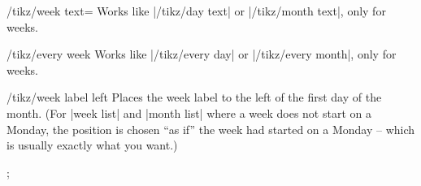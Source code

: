 \begin{multicols}{2}
\begin{key}{/tikz/week text=}
  Works like |/tikz/day text| or |/tikz/month text|, only for weeks.
\end{key}

\begin{stylekey}{/tikz/every week}
  Works like |/tikz/every day| or |/tikz/every month|, only for weeks.
\end{stylekey}

\begin{stylekey}{/tikz/week label left}
    Places the week label to the left of the first day of the month. (For
    |week list| and |month list| where a week does not start on a Monday, the
    position is chosen ``as if'' the week had started on a Monday --  which is
    usually exactly what you want.)
\begin{codeexample}[preamble={\usetikzlibrary{ext.calendar-plus}}]
\tikz
  \calendar [week list, month label above centered,
             dates=2022-07-01 to 2022-07-31,
             week label left,
             every week/.append style={gray!50!black,font=\sffamily}];
\end{codeexample}
\end{stylekey}

\end{multicols}
\endinput
